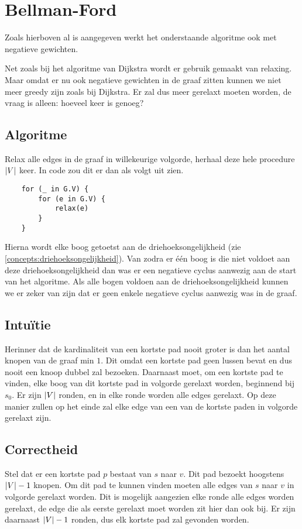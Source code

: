 \documentclass[conference]{IEEEtran}
\theoremstyle{definition}
\DeclarePairedDelimiter{\card}{\vert}{\vert}  %
\begin{document}
\section{Bellman-Ford}
Zoals hierboven al is aangegeven werkt het onderstaande algoritme ook met negatieve gewichten.

Net zoals bij het algoritme van Dijkstra wordt er gebruik gemaakt van relaxing. Maar omdat er nu ook negatieve gewichten in de graaf zitten kunnen we niet meer greedy zijn zoals bij Dijkstra. Er zal dus meer gerelaxt moeten worden, de vraag is alleen: hoeveel keer is genoeg?

\subsection{Algoritme}
Relax alle edges in de graaf in willekeurige volgorde, herhaal deze hele procedure $\card{V}$ keer.
In code zou dit er dan als volgt uit zien.
\begin{verbatim}
    for (_ in G.V) {
        for (e in G.V) {
            relax(e)
        }
    }
\end{verbatim}
Hierna wordt elke boog getoetst aan de driehoeksongelijkheid (zie \ref{concepts:driehoeksongelijkheid}). Van zodra er één boog is die niet voldoet aan deze driehoeksongelijkheid dan was er een negatieve cyclus aanwezig aan de start van het algoritme. Als alle bogen voldoen aan de driehoeksongelijkheid kunnen we er zeker van zijn dat er geen enkele negatieve cyclus aanwezig was in de graaf.

\subsection{Intuïtie}
Herinner dat de kardinaliteit van een kortste pad nooit groter is dan het aantal knopen van de graaf min $1$. Dit omdat een kortste pad geen lussen bevat en dus nooit een knoop dubbel zal bezoeken. Daarnaast moet, om een kortste pad te vinden, elke boog van dit kortste pad in volgorde gerelaxt worden, beginnend bij $s_0$. Er zijn $\card{V}$ ronden, en in elke ronde worden alle edges gerelaxt. Op deze manier zullen op het einde zal elke edge van een van de kortste paden in volgorde gerelaxt zijn.

\subsection{Correctheid}
Stel dat er een kortste pad $p$ bestaat van $s$ naar $v$. Dit pad bezoekt hoogstens $\card{V} - 1$ knopen. Om dit pad te kunnen vinden moeten alle edges van $s$ naar $v$ in volgorde gerelaxt worden. Dit is mogelijk aangezien elke ronde alle edges worden gerelaxt, de edge die als eerste gerelaxt moet worden zit hier dan ook bij. Er zijn daarnaast $\card{V} - 1$ ronden, dus elk kortste pad zal gevonden worden.
\end{document}
